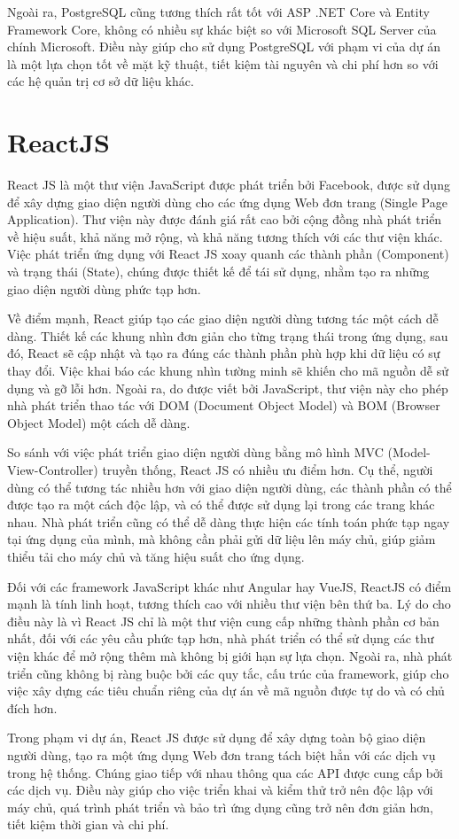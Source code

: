 \documentclass[../DoAn.tex]{subfiles}
\begin{document}
Ngoài ra, PostgreSQL cũng tương thích rất tốt với ASP .NET Core và Entity Framework Core, không có nhiều sự khác biệt so với Microsoft SQL Server
của chính Microsoft. Điều này giúp cho sử dụng PostgreSQL với phạm vi của dự án là một lựa chọn tốt về mặt kỹ thuật, tiết kiệm tài nguyên và chi
phí hơn so với các hệ quản trị cơ sở dữ liệu khác.

\section{ReactJS}
\label{section:3.5}
React JS là một thư viện JavaScript được phát triển bởi Facebook, được sử dụng để xây dựng giao diện người dùng cho các ứng dụng Web đơn trang
(Single Page Application). Thư viện này được đánh giá rất cao bởi cộng đồng nhà phát triển về hiệu suất, khả năng mở rộng, và khả năng tương thích với các thư viện khác.
Việc phát triển ứng dụng với React JS xoay quanh các thành phần (Component) và trạng thái (State), chúng được thiết kế để tái sử dụng, nhằm tạo ra những giao diện
người dùng phức tạp hơn.

Về điểm mạnh, React giúp tạo các giao diện người dùng tương tác một cách dễ dàng. Thiết kế các khung nhìn đơn giản cho từng trạng thái trong ứng dụng, sau đó, React sẽ cập nhật và
tạo ra đúng các thành phần phù hợp khi dữ liệu có sự thay đổi. Việc khai báo các khung nhìn tường minh sẽ khiến cho mã nguồn dễ sử dụng và gỡ lỗi hơn. Ngoài ra, do được
viết bởi JavaScript, thư viện này cho phép nhà phát triển thao tác với DOM (Document Object Model) và BOM (Browser Object Model) một cách dễ dàng.

So sánh với việc phát triển giao diện người dùng bằng mô hình MVC (Model-View-Controller) truyền thống, React JS có nhiều ưu điểm hơn. Cụ thể, người dùng có thể tương tác nhiều
hơn với giao diện người dùng, các thành phần có thể được tạo ra một cách độc lập, và có thể được sử dụng lại trong các trang khác nhau. Nhà phát triển cũng có thể dễ dàng
thực hiện các tính toán phức tạp ngay tại ứng dụng của mình, mà không cần phải gửi dữ liệu lên máy chủ, giúp giảm thiểu tải cho máy chủ và tăng hiệu suất cho ứng dụng.

Đối với các framework JavaScript khác như Angular hay VueJS, ReactJS có điểm mạnh là tính linh hoạt, tương thích cao với nhiều thư viện bên thứ ba. Lý do cho điều này là vì
React JS chỉ là một thư viện cung cấp những thành phần cơ bản nhất, đối với các yêu cầu phức tạp hơn, nhà phát triển có thể sử dụng các thư viện khác để mở rộng thêm mà không
bị giới hạn sự lựa chọn. Ngoài ra, nhà phát triển cũng không bị ràng buộc bởi các quy tắc, cấu trúc của framework, giúp cho việc xây dựng các tiêu chuẩn riêng của dự án
về mã nguồn được tự do và có chủ đích hơn.

Trong phạm vi dự án, React JS được sử dụng để xây dựng toàn bộ giao diện người dùng, tạo ra một ứng dụng Web đơn trang tách biệt hẳn với các dịch vụ trong hệ thống. Chúng
giao tiếp với nhau thông qua các API được cung cấp bởi các dịch vụ. Điều này giúp cho việc triển khai và kiểm thử trở nên độc lập với máy chủ, quá trình phát triển và bảo trì
ứng dụng cũng trở nên đơn giản hơn, tiết kiệm thời gian và chi phí.
\end{document}
